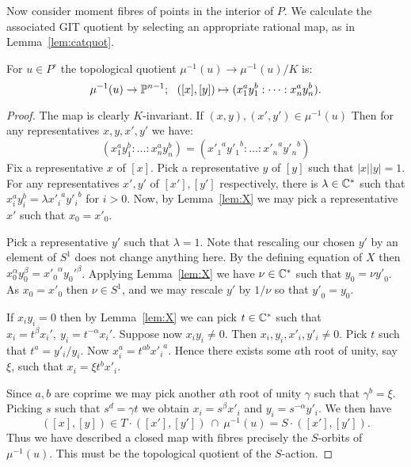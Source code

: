 %
%
%
Now consider moment fibres of points in the interior of \(P\). We calculate the associated GIT quotient by selecting an appropriate rational map, as in Lemma~\ref{lem:catquot}.
\begin{lemma} \label{lem:3.3}
For \(u \in P^\circ\) the topological quotient \(\mu^{-1}(u) \to \mu^{-1}(u)/K \) is:
\[
\mu^{-1}(u) \to \PP^{n-1}; \ \ ([x],[y]) \mapsto (x_1^a y_1^b: \dots : x_n^a y_n^b ).
\]
\end{lemma}
%
%
%
\begin{proof}
The map is clearly \(K\)-invariant. If \((x,y), ({x'},{y'}) \in \mu^{-1}(u)\) Then for any representatives \(x,y,{x'},{y'}\) we have:
\[
(x_1^a y_1^b: \dots : x_n^a y_n^b) = ({x'_1}^a {y'_1}^b: \dots : {x'_n}^a {y'_n}^b)
\]
Fix a representative \(x\) of \([x]\). Pick a representative \(y\) of \([y]\) such that \(|x||y| = 1\). For any representatives \({x'},{y'}\) of \([x'],[y']\) respectively, there is \(\lambda \in \mathbb{C}^*\) such that \( x_i^a y_i^b = \lambda {{x'_i}}^a {{y'_i}}^b\) for \(i>0\). Now, by Lemma~\ref{lem:X} we may pick a representative \({x'}\) such that \(x_0 = {{x'_0}}\).

Pick a representative \(y'\) such that \(\lambda = 1\). Note that rescaling our chosen \(y'\) by an element of \(S^1\) does not change anything here. By the defining equation of \(X\) then  \(x_0^\alpha y_0^\beta = {x'_0}^\alpha {y_0'}^\beta \). Applying Lemma~\ref{lem:X} we have \(\nu \in \mathbb{C}^*\) such that \(y_0 = \nu {y'}_0\). As \(x_0 = {x'}_0\) then \(\nu \in S^1\), and we may rescale \({y'}\) by \(1/\nu\) so that \({y'}_0 = y_0\).

If \(x_iy_i = 0\) then by Lemma~\ref{lem:X} we can pick \(t \in \mathbb{C}^*\) such that \(x_i = t^\beta x_i', \ y_i = t^{-\alpha} x_i'\). Suppose now \(x_iy_i \neq 0\). Then \(x_i,y_i,{x'_i},{y'_i} \neq 0\). Pick \(t\) such that \(t^a = {y'_i}/y_i\). Now \(x_i^a = t^{a b} {x'_i}^a\). Hence there exists some \(a\)th root of unity, say \(\xi\), such that \(x_i = \xi t^b {x'_i}\).

Since \(a,b\) are coprime we may pick another \(a\)th root of unity \(\gamma\) such that \(\gamma^b = \xi\). Picking \(s\) such that \(s^d = \gamma t\) we obtain \(x_i = s^\beta {x'}_i\) and \(y_i = s^{-\alpha} {y'_i}\). We then have
\[
([x],[y]) \in T \cdot ([x'],[y']) \ \cap \ \mu^{-1}(u) = S \cdot ([x'],[y']).
\]
Thus we have described a closed map with fibres precisely the \(S\)-orbits of \(\mu^{-1}(u)\). This must be the topological quotient of the \(S\)-action.
\end{proof}
%
